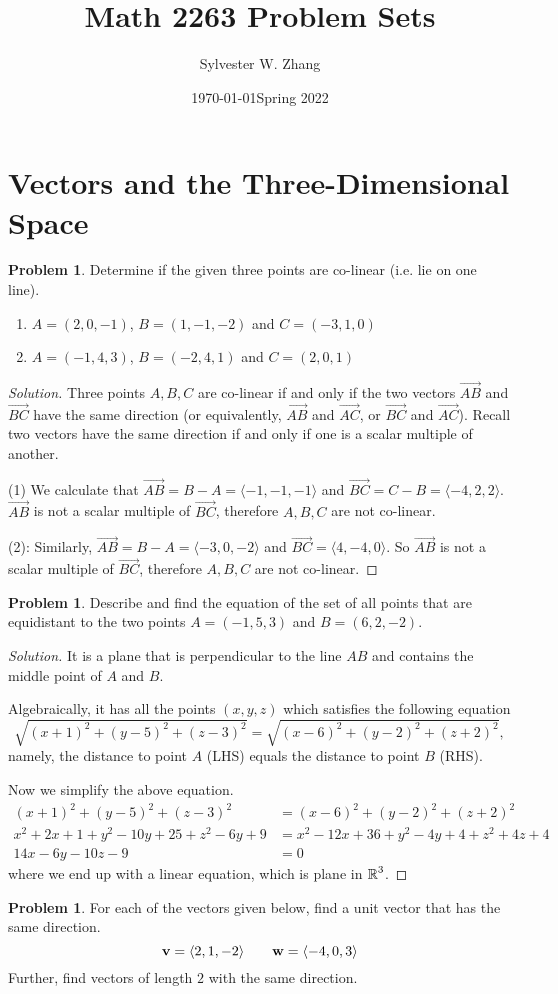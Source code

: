 \documentclass[12pt]{amsart}%
\title[MATH 2263 Spring 2022]{Math 2263 Problem Sets}
\author[MATH 2263 Spring 2022]{Sylvester W. Zhang}
\date{\today}
\theoremstyle{plain}
\theoremstyle{definition}
\newtheorem{prob}[theorem]{Problem}
\theoremstyle{special}
\newcommand{\sol}[1]{
{\begin{proof}[Solution]#1\end{proof}}
}
\newcommand{\Prob}[1]{\begin{tcolorbox}%
\begin{prob}
	#1
\end{prob}
\end{tcolorbox}	
}
\begin{document}
\date{Spring 2022}



\maketitle
\setcounter{tocdepth}{1}
\tableofcontents
\setlength{\parindent}{0em}
\setlength{\parskip}{0.618em}

\tableofcontents

\newpage
\section{Vectors and the Three-Dimensional Space}

\Prob{
	Determine if the given three points are co-linear (i.e. lie on one line).%
	\begin{enumerate}
		\item $A=( 2,0,-1) $, $B=(1,-1,-2)$ and $C=(-3,1,0)$
		\item $A=(-1,4,3)$, $B=(-2,4,1)$ and $C=(2,0,1)$
	\end{enumerate}}
\sol{
Three points $A,B,C$ are co-linear if and only if the two vectors $\overrightarrow{AB}$ and $\overrightarrow{BC}$ have the same direction (or equivalently, $\overrightarrow{AB}$ and $\overrightarrow{AC}$, or $\overrightarrow{BC}$ and $\overrightarrow{AC}$). Recall two vectors have the same direction if and only if one is a scalar multiple of another.

(1) We calculate that $\overrightarrow{AB}=B-A=\langle-1,-1,-1\rangle$ and $\overrightarrow {BC}= C-B=\langle -4,2,2\rangle$. $\overrightarrow{AB}$ is not a scalar multiple of $\overrightarrow{BC}$, therefore $A,B,C$ are not co-linear.

(2): Similarly, $\overrightarrow{AB}=B-A=\langle -3,0,-2\rangle$ and $\overrightarrow{BC}=\langle 4,-4,0\rangle$. So $\overrightarrow{AB}$ is not a scalar multiple of $\overrightarrow{BC}$, therefore $A,B,C$ are not co-linear.\qedhere
}
\Prob{
	Describe and find the equation of the set of all points that are equidistant to the two points $A=(-1,5,3)$ and $B=(6,2,-2)$.
}
\sol{It is a plane that is perpendicular to the line $AB$ and contains the middle point of $A$ and $B$.

Algebraically, it has all the points $(x,y,z)$ which satisfies the following equation
\[\sqrt{(x+1)^2+(y-5)^2+(z-3)^2}=\sqrt{(x-6)^2+(y-2)^2+(z+2)^2},\]
namely, the distance to point $A$ (LHS) equals the distance to point $B$ (RHS).

Now we simplify the above equation.
%
\begin{align*}
	(x+1)^2+(y-5)^2+(z-3)^2&=(x-6)^2+(y-2)^2+(z+2)^2\\
	x^2+2x+1+y^2-10y+25+z^2-6y+9&=x^2-12x+36+y^2-4y+4+z^2+4z+4\\
	14 x- 6 y - 10 z - 9&=0
\end{align*}
where we end up with a linear equation, which is plane in $\operatorname{\mathbb{R}}^3$.
}
\Prob{
For each of the vectors given below, find a unit vector that has the same direction.
\[{\bf v}= \langle 2,1,-2\rangle\quad\quad{\bf w}=\langle -4,0,3 \rangle\]
Further, find vectors of length $2$ with the same direction.
}
\end{document}

